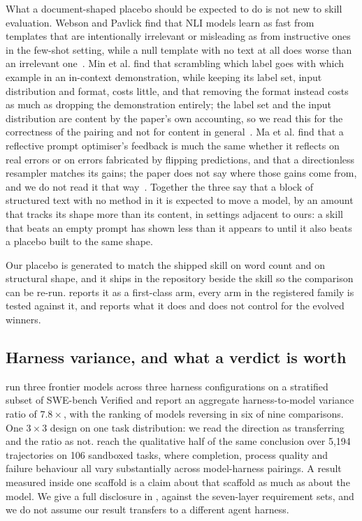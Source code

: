 What a document-shaped placebo should be expected to do is not new to skill
evaluation. Webson and Pavlick find that NLI models learn as fast from
templates that are intentionally irrelevant or misleading as from
instructive ones in the few-shot setting, while a null template with no text
at all does worse than an irrelevant
one~\citep{webson2022understand}. Min et al. find that scrambling which
label goes with which example in an in-context demonstration, while keeping
its label set, input distribution and format, costs little, and that
removing the format instead costs as much as dropping the demonstration
entirely; the label set and the input distribution are content by the
paper's own accounting, so we read this for the correctness of the pairing
and not for content in general~\citep{min2022demonstrations}. Ma et al. find
that a reflective prompt optimiser's feedback is much the same whether it
reflects on real errors or on errors fabricated by flipping predictions, and
that a directionless resampler matches its gains; the paper does not say
where those gains come from, and we do not read it that
way~\citep{ma2024promptoptimizers}. Together the three say that a block of
structured text with no method in it is expected to move a model, by an
amount that tracks its shape more than its content, in settings adjacent to
ours: a skill that beats an empty prompt has shown less than it appears to
until it also beats a placebo built to the same shape.

Our placebo is generated to match the shipped skill on word count and on
structural shape, and it ships in the repository beside the skill so the
comparison can be re-run.  reports it as a first-class
arm, every arm in the registered family is tested against it, and
 reports what it does and does not control for the
evolved winners.

\subsection{Harness variance, and what a verdict is worth}

\citet{harnessdisclosure2026} run three frontier models across three harness
configurations on a stratified subset of SWE-bench Verified and report an
aggregate harness-to-model variance ratio of $7.8\times$, with the ranking
of models reversing in six of nine comparisons. One $3\times3$ design on one
task distribution: we read the direction as transferring and the ratio as
not. \citet{harnessbench2026} reach the qualitative half of the same
conclusion over 5{,}194 trajectories on 106 sandboxed tasks, where
completion, process quality and failure behaviour all vary substantially
across model-harness pairings. A result measured inside one scaffold is a
claim about that scaffold as much as about the model. We give a full
disclosure in , against the seven-layer
requirement \citet{harnessdisclosure2026} sets, and we do not assume our
result transfers to a different agent harness.

